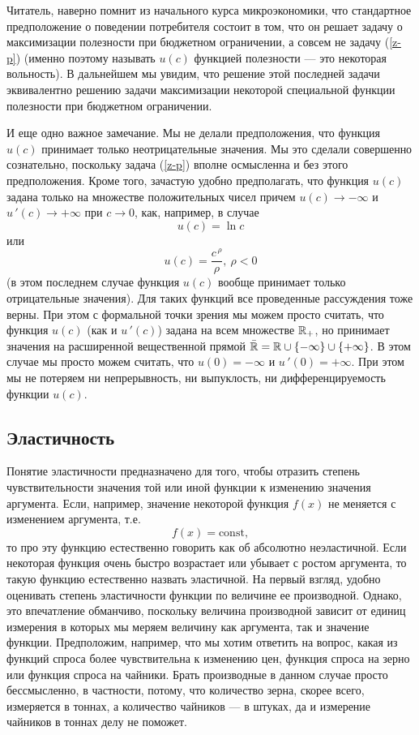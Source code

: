     Читатель, наверно помнит из начального курса микроэкономики, что
    стандартное предположение о поведении потребителя состоит в
    том, что он решает задачу о максимизации полезности при бюджетном
    ограничении, а совсем не задачу (\ref{z-p}) (именно поэтому называть
    $u(c)$ функцией полезности --- это некоторая вольность). В дальнейшем мы
    увидим, что решение этой последней задачи эквивалентно решению
    задачи максимизации некоторой специальной функции полезности при
    бюджетном ограничении.

    И еще одно важное замечание. Мы не делали предположения, что функция
    $u(c)$ принимает только неотрицательные значения. Мы это сделали
    совершенно сознательно, поскольку задача (\ref{z-p}) вполне
    осмысленна и без этого предположения. Кроме того, зачастую
    удобно предполагать, что функция $u(c)$ задана только на
    множестве положительных чисел причем $u(c)\rightarrow-\infty$ и
    $u\,'(c)\rightarrow+\infty$ при $c\rightarrow 0$, как, например, в случае
    \[u(c)=\ln c\]
    или
    \[u(c)=\frac{c^{\,\rho}}{\rho}, \ \rho<0\]
    (в этом последнем случае функция $u(c)$ вообще принимает только отрицательные
    значения).
    Для таких функций все проведенные рассуждения тоже верны. При этом с
     формальной точки зрения мы можем просто считать, что функция
    $u(c)$ (как и $u\,'(c)$) задана на всем множестве $\mathbb{R}_{+}$, но принимает значения
    на расширенной вещественной прямой $\bar{\mathbb{R}}=\mathbb{R}\cup\{-\infty\}\cup\{+\infty\}$. В
    этом случае мы просто можем считать, что $u(0)=-\infty$ и
    $u\,'(0)=+\infty$. При этом мы не потеряем ни непрерывность, ни
    выпуклость, ни дифференцируемость функции $u(c)$.












\subsection{Эластичность}
    Понятие эластичности предназначено для того, чтобы отразить степень
    чувствительности значения той или иной функции к изменению значения
    аргумента. Если, например, значение некоторой функция $f(x)$ не меняется с
    изменением аргумента, т.е.
    \[f(x)=\text{const},\]
    то про эту функцию естественно говорить как об абсолютно
    неэластичной. Если некоторая функция очень быстро возрастает или
    убывает с ростом аргумента, то такую функцию естественно назвать
    эластичной. На первый взгляд, удобно оценивать степень эластичности
    функции по величине ее производной.
    Однако, это впечатление обманчиво, поскольку величина производной
    зависит от единиц измерения в которых мы меряем величину как аргумента,
    так и значение функции. Предположим, например, что мы хотим ответить на вопрос,
    какая из функций спроса более чувствительна к изменению цен, функция
    спроса на зерно или функция спроса на чайники. Брать производные в
    данном случае просто бессмысленно, в частности, потому, что количество
     зерна, скорее всего, измеряется в тоннах, а количество чайников --- в
     штуках, да и измерение чайников в тоннах делу не поможет.


